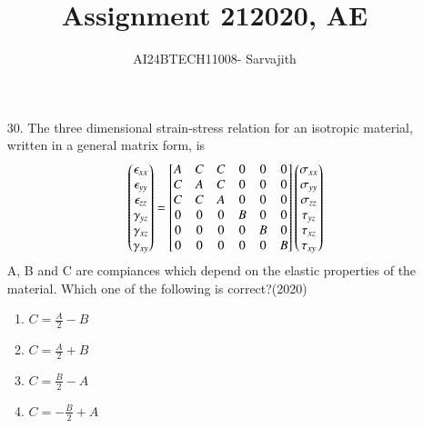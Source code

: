 \documentclass[journal]{IEEEtran}
\begin{document}

\vspace{3cm}


\author{AI24BTECH11008- Sarvajith
}
\title{Assignment 21}
{\let\newpage\relax\maketitle}
\title{2020, AE}
\renewcommand{\thefigure}{\theenumi}
\renewcommand{\thetable}{\theenumi}
\setlength{\intextsep}{10pt} %
\renewcommand{\thetable}{\theenumi}
\begin{enumerate}
    \item[30.] The three dimensional strain-stress relation for an isotropic material, written in a general matrix form, is
    $$\begin{pmatrix}\epsilon_{xx}\\\epsilon_{yy}\\\epsilon_{zz}\\\gamma_{yz}\\\gamma_{xz}\\\gamma_{xy}\end{pmatrix}=\begin{bmatrix}A&C&C&0&0&0\\C&A&C&0&0&0\\C&C&A&0&0&0\\0&0&0&B&0&0\\0&0&0&0&B&0\\0&0&0&0&0&B\end{bmatrix}\begin{pmatrix}\sigma_{xx}\\\sigma_{yy}\\\sigma_{zz}\\\tau_{yz}\\\tau_{xz}\\\tau_{xy}\\\end{pmatrix}$$
    A, B and C are compiances which depend on the elastic properties of the material. Which one of the following is correct?\hfill (2020)
    \begin{enumerate}[label=(\Alph*)]
        \item $C = \frac{A}{2} - B$
        \item $C = \frac{A}{2} + B$
        \item $C = \frac{B}{2} - A$
        \item $C = -\frac{B}{2} + A$
    \end{enumerate}

\end{enumerate}
\end{document}
